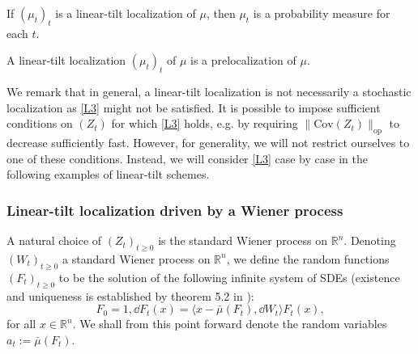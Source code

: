 \begin{proposition}
  If \((\mu_t)_t\) is a linear-tilt localization of \(\mu\), then \(\mu_t\) is a probability measure for each \(t\).
\end{proposition}

\begin{corollary}
  A linear-tilt localization \((\mu_t)_t\) of \(\mu\) is a prelocalization of \(\mu\).
\end{corollary}

We remark that in general, a linear-tilt localization is not necessarily a stochastic localization as \ref{L3} 
might not be satisfied. It is possible to impose sufficient conditions on \((Z_t)\) for which \ref{L3} holds,
e.g. by requiring \(\|\text{Cov}(Z_t)\|_{\text{op}}\) to decrease sufficiently fast. However, for generality, 
we will not restrict ourselves to one of these conditions. Instead, we will consider \ref{L3} case by case 
in the following examples of linear-tilt schemes. 

\subsubsection{Linear-tilt localization driven by a Wiener process}\label{sec:construct}

A natural choice of \((Z_t)_{t \ge 0}\) is the standard Wiener process on \(\mathbb{R}^n\).
Denoting \((W_t)_{t \ge 0}\) a standard Wiener process on \(\mathbb{R}^n\), we define the random functions 
\((F_t)_{t \ge 0}\) to be the solution of the following infinite system of SDEs 
(existence and uniqueness is established by theorem 5.2 in \cite{Øksendal_2003}): 
\begin{equation}\label{eq:stoch_loc}
  F_0 = 1, \dd F_t(x) = \langle x - \bar{\mu}(F_t), \dd W_t \rangle F_t(x),
\end{equation}
for all \(x \in \mathbb{R}^n\). We shall from this point forward denote the random variables \(a_t := \bar{\mu}(F_t)\).

